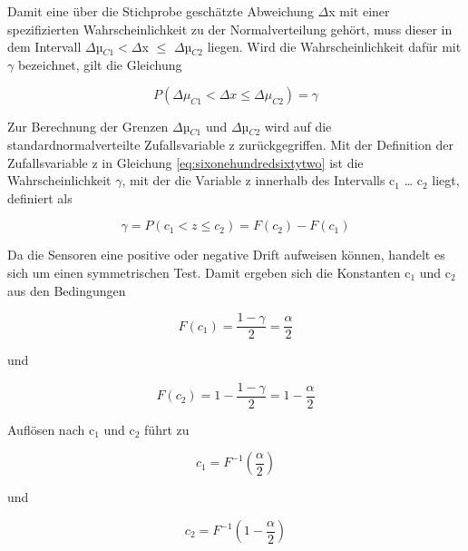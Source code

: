 \noindent Damit eine \"{u}ber die Stichprobe gesch\"{a}tzte Abweichung $\Delta$x mit einer spezifizierten Wahrscheinlichkeit zu der Normalverteilung geh\"{o}rt, muss dieser in dem Intervall $\Delta$µ$_{C1} < \Delta$x $\leq$ $\Delta$µ$_{C2}$ liegen. Wird die Wahrscheinlichkeit daf\"{u}r mit $\gamma$ bezeichnet, gilt die Gleichung

\begin{equation}\label{eq:sixonehundredsixtythree}
P\left(\Delta \mu _{C1} <\Delta x\le \Delta \mu _{C2} \right)=\gamma
\end{equation}

\noindent Zur Berechnung der Grenzen $\Delta$µ$_{C1}$ und $\Delta$µ$_{C2}$ wird auf die standardnormalverteilte Zufallsvariable z zur\"{u}ckgegriffen. Mit der Definition der Zufallsvariable z in Gleichung \eqref{eq:sixonehundredsixtytwo} ist die Wahrscheinlichkeit $\gamma$, mit der die Variable z innerhalb des Intervalls c$_{1}$ {\dots} c$_{2}$ liegt, definiert als

\begin{equation}\label{eq:sixonehundredsixtyfour}
\gamma =P\left(c_{1} <z\le c_{2} \right)=F(c_{2})-F(c_{1})
\end{equation}

\noindent Da die Sensoren eine positive oder negative Drift aufweisen k\"{o}nnen, handelt es sich um einen symmetrischen Test. Damit ergeben sich die Konstanten c$_{1}$ und c$_{2}$ aus den Bedingungen

\begin{equation}\label{eq:sixonehundredsixtyfive}
F(c_{1})=\dfrac{1-\gamma}{2} =\dfrac{\alpha}{2}
\end{equation}

\noindent und

\begin{equation}\label{eq:sixonehundredsixtysix}
F(c_{2})=1-\dfrac{1-\gamma}{2} =1-\dfrac{\alpha}{2}
\end{equation}

\noindent Aufl\"{o}sen nach c$_{1}$ und c$_{2}$ f\"{u}hrt zu

\begin{equation}\label{eq:sixonehundredsixtyseven}
c_{1} =F^{-1} \left(\dfrac{\alpha}{2} \right)
\end{equation}

\noindent und

\begin{equation}\label{eq:sixonehundredsixtyeight}
c_{2} =F^{-1} \left(1-\dfrac{\alpha }{2} \right)
\end{equation}

